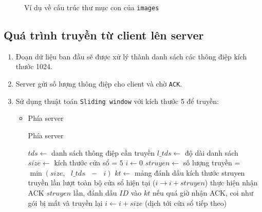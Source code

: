 \begin{figure}[H]
\caption{Ví dụ về cấu trúc thư mục con của \texttt{images}}
\end{figure}

\subsection{Quá trình truyền từ client lên server}
\begin{enumerate}
\item Đoạn dữ liệu ban đầu sẽ được xử lý thành danh sách các thông điệp kích thước 1024.
\item Server gửi số lượng thông điệp cho client và chờ \texttt{ACK}.
\item Sử dụng thuật toán \texttt{Sliding window} với kích thước 5 để truyền:
\begin{itemize}
\item Phía server
\begin{breakablealgorithm}
  \caption{Phía server}
  \begin{algorithmic}[1]
	\State $tds \gets $ danh sách thông điệp cần truyền
	\State $l\_tds \gets $ độ dài danh sách
    \State $size \gets $ kích thước cửa sổ = $5$
    \State $i \gets 0 $
    	\State $struyen \gets $ số lượng truyền = $\min\left( {size,{\text{ }}l\_tds{\text{ }} - {\text{ }}i} \right)$
    	\State $kt \gets$ mảng đánh dấu kích thước struyen
    		\State truyền lần lượt toàn bộ cửa sổ hiện tại ($i \to i + struyen$)
    		\State thực hiện nhận ACK $struyen$ lần, đánh dấu $ID$ vào $kt$
    		\State nếu quá giờ nhận ACK, coi như gói bị mất và truyền lại
    	\EndWhile
    	\State $i \gets i + size$ (dịch tới cửa sổ tiếp theo)
    \EndWhile
    \EndFunction
  \end{algorithmic}
\end{breakablealgorithm}

\end{itemize}
\end{enumerate}